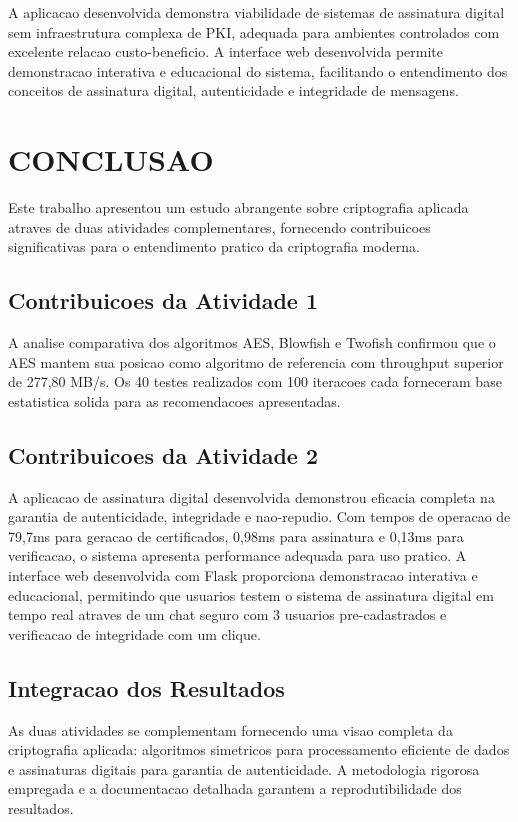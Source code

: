 \documentclass[12pt,a4paper,oneside]{article}
\begin{document}
A aplicacao desenvolvida demonstra viabilidade de sistemas de assinatura digital sem infraestrutura complexa de PKI, adequada para ambientes controlados com excelente relacao custo-beneficio. A interface web desenvolvida permite demonstracao interativa e educacional do sistema, facilitando o entendimento dos conceitos de assinatura digital, autenticidade e integridade de mensagens.

\section{CONCLUSAO}

Este trabalho apresentou um estudo abrangente sobre criptografia aplicada atraves de duas atividades complementares, fornecendo contribuicoes significativas para o entendimento pratico da criptografia moderna.

\subsection{Contribuicoes da Atividade 1}

A analise comparativa dos algoritmos AES, Blowfish e Twofish confirmou que o AES mantem sua posicao como algoritmo de referencia com throughput superior de 277,80 MB/s. Os 40 testes realizados com 100 iteracoes cada forneceram base estatistica solida para as recomendacoes apresentadas.

\subsection{Contribuicoes da Atividade 2}

A aplicacao de assinatura digital desenvolvida demonstrou eficacia completa na garantia de autenticidade, integridade e nao-repudio. Com tempos de operacao de 79,7ms para geracao de certificados, 0,98ms para assinatura e 0,13ms para verificacao, o sistema apresenta performance adequada para uso pratico. A interface web desenvolvida com Flask proporciona demonstracao interativa e educacional, permitindo que usuarios testem o sistema de assinatura digital em tempo real atraves de um chat seguro com 3 usuarios pre-cadastrados e verificacao de integridade com um clique.

\subsection{Integracao dos Resultados}

As duas atividades se complementam fornecendo uma visao completa da criptografia aplicada: algoritmos simetricos para processamento eficiente de dados e assinaturas digitais para garantia de autenticidade. A metodologia rigorosa empregada e a documentacao detalhada garantem a reprodutibilidade dos resultados.
\end{document}
